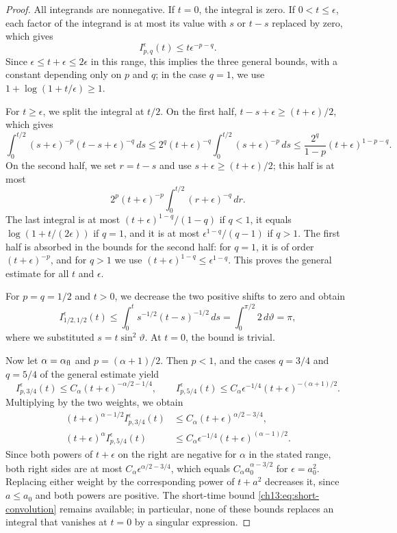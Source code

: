 \begin{proof}
All integrands are nonnegative. If $t=0$, the integral is zero. If $0<t\le\epsilon$, each factor of the integrand is at most its value with $s$ or $t-s$ replaced by zero, which gives
\begin{equation}\label{ch13:eq:short-convolution}
 I_{p,q}^\epsilon(t)\le t\epsilon^{-p-q}.
\end{equation}
Since $\epsilon\le t+\epsilon\le2\epsilon$ in this range, this implies the three general bounds, with a constant depending only on $p$ and $q$; in the case $q=1$, we use $1+\log(1+t/\epsilon)\ge1$.

For $t\ge\epsilon$, we split the integral at $t/2$. On the first half, $t-s+\epsilon\ge(t+\epsilon)/2$, which gives
\[
 \int_0^{t/2}(s+\epsilon)^{-p}(t-s+\epsilon)^{-q}\,ds\le2^q(t+\epsilon)^{-q}\int_0^{t/2}(s+\epsilon)^{-p}\,ds\le\frac{2^q}{1-p}(t+\epsilon)^{1-p-q}.
\]
On the second half, we set $r=t-s$ and use $s+\epsilon\ge(t+\epsilon)/2$; this half is at most
\[
 2^p(t+\epsilon)^{-p}\int_0^{t/2}(r+\epsilon)^{-q}\,dr.
\]
The last integral is at most $(t+\epsilon)^{1-q}/(1-q)$ if $q<1$, it equals $\log(1+t/(2\epsilon))$ if $q=1$, and it is at most $\epsilon^{1-q}/(q-1)$ if $q>1$. The first half is absorbed in the bounds for the second half: for $q=1$, it is of order $(t+\epsilon)^{-p}$, and for $q>1$ we use $(t+\epsilon)^{1-q}\le\epsilon^{1-q}$. This proves the general estimate for all $t$ and $\epsilon$.

For $p=q=1/2$ and $t>0$, we decrease the two positive shifts to zero and obtain
\[
 I_{1/2,1/2}^\epsilon(t)\le\int_0^ts^{-1/2}(t-s)^{-1/2}\,ds=\int_0^{\pi/2}2\,d\vartheta=\pi,
\]
where we substituted $s=t\sin^2\vartheta$. At $t=0$, the bound is trivial.

Now let $\alpha=\alpha_{\mathrm{fl}}$ and $p=(\alpha+1)/2$. Then $p<1$, and the cases $q=3/4$ and $q=5/4$ of the general estimate yield
\[
 I_{p,3/4}^\epsilon(t)\le C_\alpha(t+\epsilon)^{-\alpha/2-1/4},\qquad I_{p,5/4}^\epsilon(t)\le C_\alpha\epsilon^{-1/4}(t+\epsilon)^{-(\alpha+1)/2}.
\]
Multiplying by the two weights, we obtain
\begin{equation}\label{ch13:eq:weighted-powers}
 \begin{split}
 (t+\epsilon)^{\alpha-1/2}I_{p,3/4}^\epsilon(t)&\le C_\alpha(t+\epsilon)^{\alpha/2-3/4},\\
 (t+\epsilon)^{\alpha}I_{p,5/4}^\epsilon(t)&\le C_\alpha\epsilon^{-1/4}(t+\epsilon)^{(\alpha-1)/2}.
 \end{split}
\end{equation}
Since both powers of $t+\epsilon$ on the right are negative for $\alpha$ in the stated range, both right sides are at most $C_\alpha\epsilon^{\alpha/2-3/4}$, which equals $C_\alpha a_0^{\alpha-3/2}$ for $\epsilon=a_0^2$. Replacing either weight by the corresponding power of $t+a^2$ decreases it, since $a\le a_0$ and both powers are positive. The short-time bound \eqref{ch13:eq:short-convolution} remains available; in particular, none of these bounds replaces an integral that vanishes at $t=0$ by a singular expression.


\end{proof}

